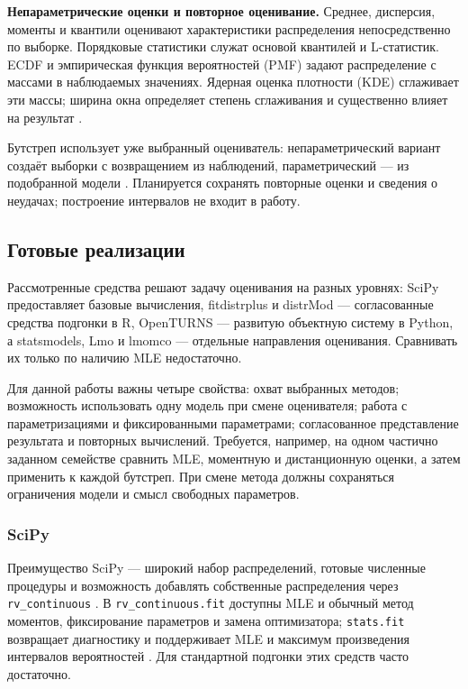 \textbf{Непараметрические оценки и повторное оценивание.}
Среднее, дисперсия, моменты и квантили оценивают характеристики
распределения непосредственно по выборке. Порядковые статистики
служат основой квантилей и L-статистик. ECDF и эмпирическая функция
вероятностей (PMF) задают распределение с массами в наблюдаемых значениях.
Ядерная оценка плотности (KDE) сглаживает эти массы; ширина окна определяет
степень сглаживания и существенно влияет на результат \cite{reviewScipyKDE}.

Бутстреп использует уже выбранный оцениватель: непараметрический вариант
создаёт выборки с возвращением из наблюдений, параметрический ---
из подобранной модели \cite{reviewEfron}. Планируется сохранять повторные
оценки и сведения о неудачах; построение интервалов не входит в работу.

\subsection{Готовые реализации}
\label{sec:implementations}
Рассмотренные средства решают задачу оценивания на разных уровнях:
SciPy предоставляет базовые вычисления, fitdistrplus и distrMod ---
согласованные средства подгонки в R, OpenTURNS --- развитую объектную
систему в Python, а statsmodels, Lmo и lmomco --- отдельные направления
оценивания. Сравнивать их только по наличию MLE недостаточно.

Для данной работы важны четыре свойства: охват выбранных методов;
возможность использовать одну модель при смене оценивателя;
работа с параметризациями и фиксированными параметрами;
согласованное представление результата и повторных вычислений.
Требуется, например, на одном частично заданном семействе сравнить MLE,
моментную и дистанционную оценки, а затем применить к каждой бутстреп.
При смене метода должны сохраняться ограничения модели и смысл
свободных параметров.

\subsubsection{SciPy}
Преимущество SciPy --- широкий набор распределений, готовые численные
процедуры и возможность добавлять собственные распределения через
\texttt{rv\_continuous} \cite{reviewScipyDistribution}.
В \texttt{rv\_continuous.fit} доступны MLE и обычный метод моментов,
фиксирование параметров и замена оптимизатора; \texttt{stats.fit}
возвращает диагностику и поддерживает MLE и максимум произведения
интервалов вероятностей \cite{reviewScipyContinuous,reviewScipyFit}.
Для стандартной подгонки этих средств часто достаточно.

